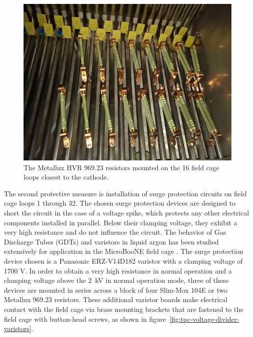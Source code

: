 \begin{figure}
\centering	
\includegraphics[width=0.8\linewidth]{figures/tpc-voltage-divider-metallux.jpg}
\caption{The Metallux HVR 969.23 resistors mounted on the 16 field cage loops closest to the cathode.}
\label{fig:tpc-voltage-divider-metallux}
\end{figure}


The second protective measure is installation of surge protection circuits on field cage loops 1 through 32.  The chosen surge protection devices are designed to short the circuit in the case of a voltage spike, which protects any other electrical components installed in parallel.  Below their clamping voltage, they exhibit a very high resistance and do not influence the circuit. The behavior of Gas Discharge Tubes (GDTs) and varistors in liquid argon has been studied extensively for application in the MicroBooNE field cage \cite{Asaadi:2014iva}. The surge protection device chosen is a Panasonic ERZ-V14D182 varistor with a clamping voltage of 1700 V. In order to obtain a very high resistance in normal operation and a clamping voltage above the 2~kV in normal operation mode, three of these devices are mounted in series across a block of four Slim-Mox 104E or two Metallux 969.23 resistors. These additional varistor boards make electrical contact with the field cage via brass mounting brackets that are fastened to the field cage with button-head screws, as shown in figure~\ref{fig:tpc-voltage-divider-varistors}.

